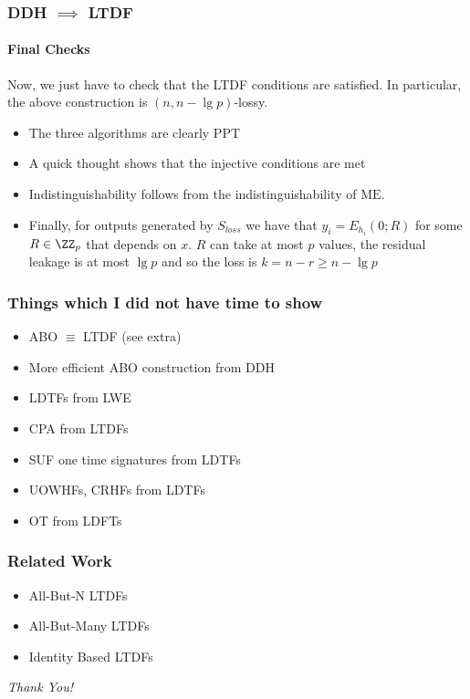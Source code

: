 \documentclass{beamer}
\begin{document}
\begin{frame}
    \frametitle{DDH $\implies$ LTDF}
    \framesubtitle{Final Checks}
    Now, we just have to check that the LTDF conditions are satisfied.
    In particular, the above construction is $(n, n - \lg p)$-lossy.
    \begin{itemize}
        \item The three algorithms are clearly PPT
        \item A quick thought shows that the injective conditions are met
        \item Indistinguishability follows from the indistinguishability of $\mathrm{ME}$.
        \item Finally, for outputs generated by $S_{loss}$ we have that
              $y_i = E_{h_i}(0; R)$ for some $R \in \ZZ_p$ that depends on $x$. $R$ can take
              at most $p$ values, the residual leakage is at most $\lg p$ and so the loss is
              $k = n - r \geq n - \lg p$
    \end{itemize}
\end{frame}

\begin{frame}
    \frametitle{Things which I did not have time to show}
    \begin{itemize}
        \item ABO $\equiv$ LTDF (see extra)
        \item More efficient ABO construction from DDH
        \item LDTFs from LWE
        \item CPA from LTDFs
        \item SUF one time signatures from LDTFs
        \item UOWHFs, CRHFs from LDTFs
        \item OT from LDFTs
    \end{itemize}
\end{frame}

\begin{frame}
    \frametitle{Related Work}
    \begin{itemize}
        \item All-But-N LTDFs
        \item All-But-Many LTDFs
        \item Identity Based LTDFs
    \end{itemize}
\end{frame}

\begin{frame}{}
    \centering \Large
    \emph{Thank You!}
\end{frame}
\end{document}
